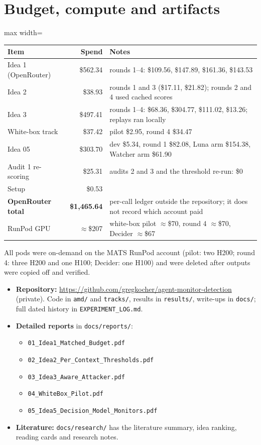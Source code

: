 \documentclass[11pt]{article}
\begin{document}
\section{Budget, compute and artifacts}
\begin{table}[H]\centering\small
\begin{adjustbox}{max width=\linewidth}
\begin{tabular}{@{}lrl@{}}
\toprule
Item & Spend & Notes\\
\midrule
Idea 1 (OpenRouter) & \$562.34 & rounds 1--4: \$109.56, \$147.89, \$161.36, \$143.53\\
Idea 2 & \$38.93 & rounds 1 and 3 (\$17.11, \$21.82); rounds 2 and 4 used cached scores\\
Idea 3 & \$497.41 & rounds 1--4: \$68.36, \$304.77, \$111.02, \$13.26; replays ran locally\\
White-box track & \$37.42 & pilot \$2.95, round 4 \$34.47\\
Idea 05 & \$303.70 & dev \$5.34, round 1 \$82.08, Luna arm \$154.38, Watcher arm \$61.90\\
Audit 1 re-scoring & \$25.31 & audits 2 and 3 and the threshold re-run: \$0\\
Setup & \$0.53 & \\
\midrule
\textbf{OpenRouter total} & \textbf{\$1{,}465.64} & per-call ledger outside the repository; it does not record which account paid\\
RunPod GPU & $\approx$\$207 & white-box pilot $\approx$\$70, round 4 $\approx$\$70, Decider $\approx$\$67\\
\bottomrule
\end{tabular}
\end{adjustbox}
\end{table}
All pods were on-demand on the MATS RunPod account (pilot: two H200; round 4: three H200 and one H100; Decider: one H100) and were deleted after outputs were copied off and verified.
\begin{itemize}
\item \textbf{Repository:} \url{https://github.com/gregkocher/agent-monitor-detection} (private). Code in \texttt{amd/} and \texttt{tracks/}, results in \texttt{results/}, write-ups in \texttt{docs/}; full dated history in \texttt{EXPERIMENT\_LOG.md}.
\item \textbf{Detailed reports} in \texttt{docs/reports/}:
  \begin{itemize}
  \item \texttt{01\_Idea1\_Matched\_Budget.pdf}
  \item \texttt{02\_Idea2\_Per\_Context\_Thresholds.pdf}
  \item \texttt{03\_Idea3\_Aware\_Attacker.pdf}
  \item \texttt{04\_WhiteBox\_Pilot.pdf}
  \item \texttt{05\_Idea5\_Decision\_Model\_Monitors.pdf}
  \end{itemize}
\item \textbf{Literature:} \texttt{docs/research/} has the literature summary, idea ranking, reading cards and research notes.
\end{itemize}
\end{document}
